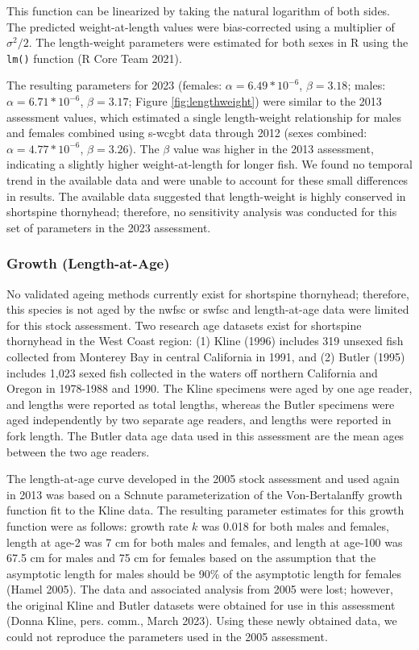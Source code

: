 \documentclass[11pt,
  english,
  letterpaper,
]{article}
\begin{document}
This function can be linearized by taking the natural logarithm of both sides. The predicted weight-at-length values were bias-corrected using a multiplier of \(\sigma^2 / 2\). The length-weight parameters were estimated for both sexes in R using the \texttt{lm()} function (R Core Team 2021).

The resulting parameters for 2023 (females: \(\alpha = 6.49*10^{-6}\), \(\beta = 3.18\); males: \(\alpha = 6.71*10^{-6}\), \(\beta = 3.17\); Figure \ref{fig:lengthweight}) were similar to the 2013 assessment values, which estimated a single length-weight relationship for males and females combined using \gls{s-wcgbt} data through 2012 (sexes combined: \(\alpha = 4.77*10^{-6}\), \(\beta=3.26\)). The \(\beta\) value was higher in the 2013 assessment, indicating a slightly higher weight-at-length for longer fish. We found no temporal trend in the available data and were unable to account for these small differences in results. The available data suggested that length-weight is highly conserved in shortspine thornyhead; therefore, no sensitivity analysis was conducted for this set of parameters in the 2023 assessment.

\hypertarget{growth-length-at-age}{%
\subsubsection{Growth (Length-at-Age)}\label{growth-length-at-age}}

No validated ageing methods currently exist for shortspine thornyhead; therefore, this species is not aged by the \gls{nwfsc} or \gls{swfsc} and length-at-age data were limited for this stock assessment. Two research age datasets exist for shortspine thornyhead in the West Coast region: (1) Kline (1996) includes 319 unsexed fish collected from Monterey Bay in central California in 1991, and (2) Butler (1995) includes 1,023 sexed fish collected in the waters off northern California and Oregon in 1978-1988 and 1990. The Kline specimens were aged by one age reader, and lengths were reported as total lengths, whereas the Butler specimens were aged independently by two separate age readers, and lengths were reported in fork length. The Butler data age data used in this assessment are the mean ages between the two age readers.

The length-at-age curve developed in the 2005 stock assessment and used again in 2013 was based on a Schnute parameterization of the Von-Bertalanffy growth function fit to the Kline data. The resulting parameter estimates for this growth function were as follows: growth rate \(k\) was 0.018 for both males and females, length at age-2 was 7 cm for both males and females, and length at age-100 was 67.5 cm for males and 75 cm for females based on the assumption that the asymptotic length for males should be 90\% of the asymptotic length for females (Hamel 2005). The data and associated analysis from 2005 were lost; however, the original Kline and Butler datasets were obtained for use in this assessment (Donna Kline, pers. comm., March 2023). Using these newly obtained data, we could not reproduce the parameters used in the 2005 assessment.
\end{document}
